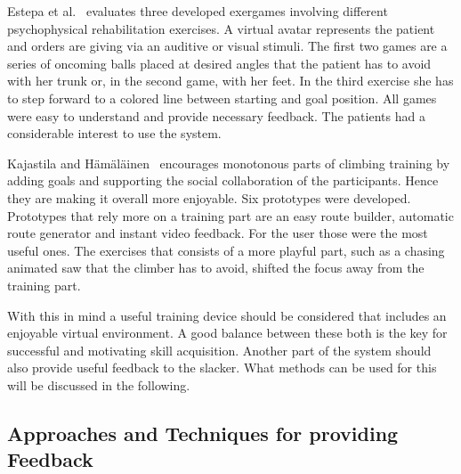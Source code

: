 Estepa et al.~\cite{Estepa2016-oj} evaluates three developed exergames involving different psychophysical rehabilitation exercises. A virtual avatar represents the patient and orders are giving via an auditive or visual stimuli. The first two games are a series of oncoming balls placed at desired angles that the patient has to avoid with her trunk or, in the second game, with her feet. In the third exercise she has to step forward to a colored line between starting and goal position. All games were easy to understand and provide necessary feedback. The patients had a considerable interest to use the system.

Kajastila and Hämäläinen~\cite{Kajastila2014-ug} encourages monotonous parts of climbing training by adding goals and supporting the social collaboration of the participants. Hence they are making it overall more enjoyable. Six prototypes were developed. Prototypes that rely more on a training part are an easy route builder, automatic route generator and instant video feedback. For the user those were the most useful ones. The exercises that consists of a more playful part, such as a chasing animated saw that the climber has to avoid, shifted the focus away from the training part. 

With this in mind a useful training device should be considered that includes an enjoyable virtual environment. A good balance between these both is the key for successful and motivating skill acquisition. Another part of the system should also provide useful feedback to the slacker. What methods can be used for this will be discussed in the following.

\subsection{Approaches and Techniques for providing Feedback}\label{2_3_3_feedbackApproachesTechniques}

